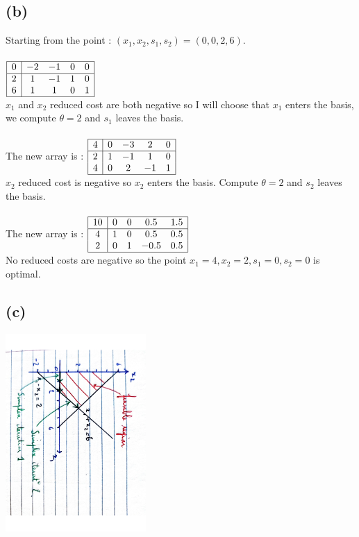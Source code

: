 \documentclass{article}
\begin{document}
\subsection*{(b)}
Starting from the point : $(x_1,x_2,s_1,s_2) = (0, 0, 2, 6)$.
\\\\
$
\begin{array}{|c|cccc|}
    \hline
    0& -2&-1&0&0\\
    \hline
    2&1 & -1& 1&0\\
    6&1&1&0&1\\
    \hline
\end{array}$\\
$x_1$ and $x_2$ reduced cost are both negative so I will choose that $x_1$ enters the basis, we compute $\theta = 2$ and $s_1$ leaves the basis.
\\\\
The new array is :
$
\begin{array}{|c|cccc|}
    \hline
    4& 0&-3&2&0\\
    \hline
    2&1 & -1& 1&0\\
    4&0&2&-1&1\\
    \hline
\end{array}$
\\
$x_2$ reduced cost is negative so $x_2$ enters the basis. Compute $\theta = 2$ and $s_2$ leaves the basis.
\\\\
The new array is :
$\begin{array}{|c|cccc|}
    \hline
    10&0&0&0.5&1.5\\
    \hline
    4&1&0&0.5&0.5\\
    2&0&1&-0.5&0.5\\
    \hline
\end{array}$
\\
No reduced costs are negative so the point $\boxed{x_1=4,x_2=2,s_1=0,s_2=0}$ is optimal.
\\
\subsection*{(c)}
\includegraphics[width = 0.4\textwidth, height =0.6\textwidth, angle = 90]{img/Document 3.pdf}
\newpage
\end{document}
